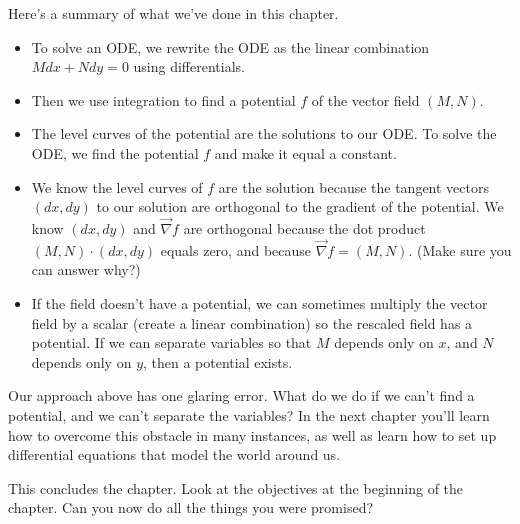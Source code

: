 Here's a summary of what we've done in this chapter.
\begin{itemize}
 \item To solve an ODE, we rewrite the ODE as the linear combination $Mdx+Ndy=0$ using differentials.  
 \item Then we use integration to find a potential $f$ of the vector field $(M,N)$. 
 \item The level curves of the potential are the solutions to our ODE. To solve the ODE, we find the potential $f$ and make it equal a constant. 
 \item We know the level curves of $f$ are the solution because the tangent vectors $(dx,dy)$ to our solution are orthogonal to the gradient of the potential. We know $(dx,dy)$ and $\vec \nabla f$ are orthogonal because the dot product $(M,N)\cdot(dx,dy)$ equals zero, and because $\vec \nabla f=(M,N)$. (Make sure you can answer why?) 
 \item If the field doesn't have a potential, we can sometimes multiply the vector field by a scalar (create a linear combination) so the rescaled field has a potential. If we can separate variables so that $M$ depends only on $x$, and $N$ depends only on $y$, then a potential exists.  
\end{itemize}
Our approach above has one glaring error.  What do we do if we can't find a potential, and we can't separate the variables? In the next chapter you'll learn how to overcome this obstacle in many instances, as well as learn how to set up differential equations that model the world around us. 

\vfill

This concludes the chapter.  Look at the objectives at the beginning of the chapter. Can you now do all the things you were promised? 


